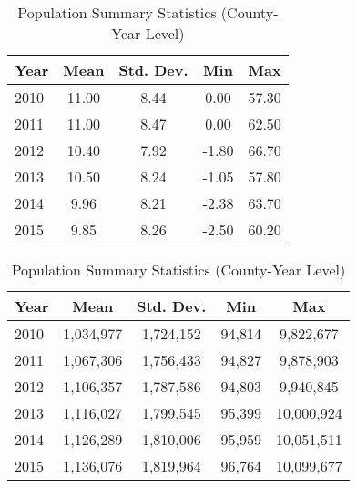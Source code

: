 \documentclass[12pt]{article}
\begin{document}
	\begin{table}[h]
		\centering
		\begin{minipage}{0.48\textwidth}
			\centering
			\caption{NO$_2$ Summary Statistics (ppb)}
			\label{tab:no2_summary}
			\begin{tabular}{l c c c c}
				\toprule
				Year & Mean & Std. Dev. & Min & Max \\
				\midrule
				2010 & 11.00 & 8.44 & 0.00 & 57.30 \\
				2011 & 11.00 & 8.47 & 0.00 & 62.50 \\
				2012 & 10.40 & 7.92 & -1.80 & 66.70 \\
				2013 & 10.50 & 8.24 & -1.05 & 57.80 \\
				2014 & 9.96 & 8.21 & -2.38 & 63.70 \\
				2015 & 9.85 & 8.26 & -2.50 & 60.20 \\
				\bottomrule
			\end{tabular}
		\end{minipage}
		\hfill
		\begin{minipage}{0.48\textwidth}
			\centering
			\caption{Population Summary Statistics (County-Year Level)}
			\label{tab:population_summary}
			\begin{tabular}{l c c c c}
				\toprule
				Year & Mean & Std. Dev. & Min & Max \\
				\midrule
				2010 & 1,034,977 & 1,724,152 & 94,814 & 9,822,677 \\
				2011 & 1,067,306 & 1,756,433 & 94,827 & 9,878,903 \\
				2012 & 1,106,357 & 1,787,586 & 94,803 & 9,940,845 \\
				2013 & 1,116,027 & 1,799,545 & 95,399 & 10,000,924 \\
				2014 & 1,126,289 & 1,810,006 & 95,959 & 10,051,511 \\
				2015 & 1,136,076 & 1,819,964 & 96,764 & 10,099,677 \\
				\bottomrule
			\end{tabular}
		\end{minipage}
	\end{table}
	
\end{document}
